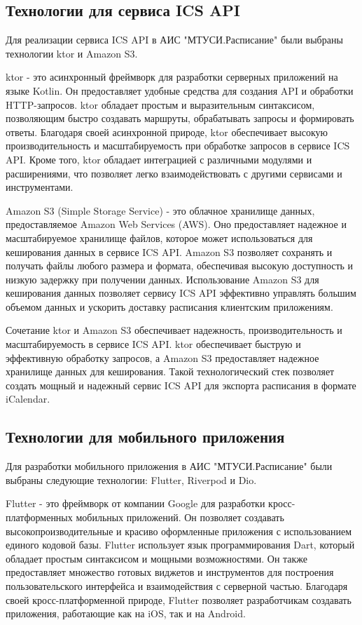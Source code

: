 \subsection{Технологии для сервиса ICS API}
Для реализации сервиса ICS API в АИС "МТУСИ.Расписание" были выбраны технологии ktor и Amazon S3.

ktor - это асинхронный фреймворк для разработки серверных приложений на языке Kotlin.
Он предоставляет удобные средства для создания API и обработки HTTP-запросов.
ktor обладает простым и выразительным синтаксисом, позволяющим быстро создавать маршруты,
обрабатывать запросы и формировать ответы. Благодаря своей асинхронной природе,
ktor обеспечивает высокую производительность и масштабируемость при обработке запросов в сервисе ICS API.
Кроме того, ktor обладает интеграцией с различными модулями и расширениями, что позволяет легко взаимодействовать
с другими сервисами и инструментами.

Amazon S3 (Simple Storage Service) - это облачное хранилище данных, предоставляемое Amazon Web Services (AWS).
Оно предоставляет надежное и масштабируемое хранилище файлов, которое может использоваться для кеширования данных в сервисе ICS API.
Amazon S3 позволяет сохранять и получать файлы любого размера и формата,
обеспечивая высокую доступность и низкую задержку при получении данных.
Использование Amazon S3 для кеширования данных позволяет сервису ICS API эффективно управлять большим
объемом данных и ускорить доставку расписания клиентским приложениям.

Сочетание ktor и Amazon S3 обеспечивает надежность, производительность и масштабируемость в сервисе ICS API.
ktor обеспечивает быструю и эффективную обработку запросов, а Amazon S3 предоставляет надежное хранилище данных для кеширования.
Такой технологический стек позволяет создать мощный и надежный сервис ICS API для экспорта расписания в формате iCalendar.

\subsection{Технологии для мобильного приложения}

Для разработки мобильного приложения в АИС "МТУСИ.Расписание" были выбраны следующие технологии: Flutter, Riverpod и Dio.

Flutter - это фреймворк от компании Google для разработки кросс-платформенных мобильных приложений.
Он позволяет создавать высокопроизводительные и красиво оформленные приложения с использованием единого кодовой базы.
Flutter использует язык программирования Dart, который обладает простым синтаксисом и мощными возможностями.
Он также предоставляет множество готовых виджетов и инструментов для построения пользовательского интерфейса
и взаимодействия с серверной частью. Благодаря своей кросс-платформенной природе,
Flutter позволяет разработчикам создавать приложения, работающие как на iOS, так и на Android.

